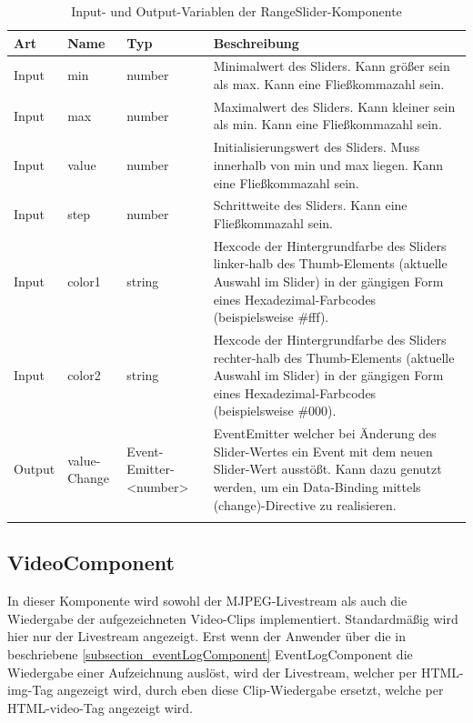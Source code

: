 \vspace{0.5cm}

\begin{longtable}[]{|p{}|p{}|p{}|p{}|}
	
		\cline{1-4}
		\textbf{Art} & \textbf{Name} & \textbf{Typ} & \textbf{Beschreibung} \\ \hline
		
		Input & min & number & Minimalwert des Sliders. Kann größer sein als max. Kann eine Fließkommazahl sein. \\ \hline
		
		Input & max & number & Maximalwert des Sliders. Kann kleiner sein als min. Kann eine Fließkommazahl sein. \\ \hline
		
		Input & value & number & Initialisierungswert des Sliders. Muss innerhalb von min und max liegen. Kann eine Fließkommazahl sein. \\ \hline
		
		Input & step & number & Schrittweite des Sliders. Kann eine Fließkommazahl sein. \\ \hline
		
		Input & color1 & string & Hexcode der Hintergrundfarbe des Sliders linker-halb des Thumb-Elements (aktuelle Auswahl im Slider) in der gängigen Form eines Hexadezimal-Farbcodes (beispielsweise \#fff). \\ \hline
		
		Input & color2 & string & Hexcode der Hintergrundfarbe des Sliders rechter-halb des Thumb-Elements (aktuelle Auswahl im Slider) in der gängigen Form eines Hexadezimal-Farbcodes (beispielsweise \#000). \\ \hline
		
		Output & value-Change & Event-Emitter-<number> & EventEmitter welcher bei Änderung des Slider-Wertes ein Event mit dem neuen Slider-Wert ausstößt. Kann dazu genutzt werden, um ein Data-Binding mittels (change)-Directive zu realisieren. \\ \hline
		
	\caption{Input- und Output-Variablen der RangeSlider-Komponente}
	\label{tab:rangeSlider_input_output}
\end{longtable}

\subsection{VideoComponent}
\label{subsection_videoComponent}
In dieser Komponente wird sowohl der \acs{MJPEG}-Livestream als auch die Wiedergabe der aufgezeichneten Video-Clips implementiert. Standardmäßig wird hier nur der Livestream angezeigt. Erst wenn der Anwender über die in beschriebene \ref{subsection_eventLogComponent} EventLogComponent die Wiedergabe einer Aufzeichnung auslöst, wird der Livestream, welcher per \acs{HTML}-img-Tag angezeigt wird, durch eben diese Clip-Wiedergabe ersetzt, welche per \acs{HTML}-video-Tag angezeigt wird.

